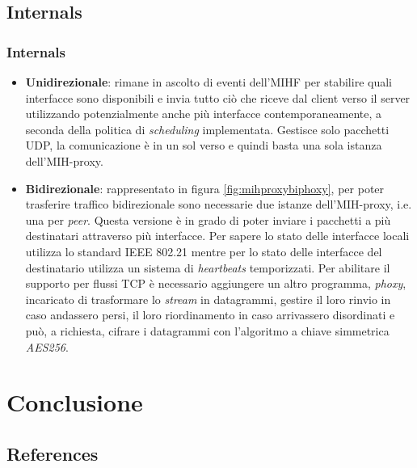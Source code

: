 \documentclass[10pt]{beamer}
\begin{document}
\subsection{Internals}
\begin{frame} %
\frametitle{Internals}
\begin{itemize}
\item \textbf{Unidirezionale}: rimane in ascolto di eventi dell'MIHF per stabilire quali interfacce sono disponibili e invia tutto ciò che riceve dal client verso il server utilizzando potenzialmente anche più interfacce contemporaneamente, a seconda della politica di {\em scheduling} implementata. Gestisce solo pacchetti UDP, la comunicazione è in un sol verso e quindi basta una sola istanza dell'MIH-proxy.
\item \textbf{Bidirezionale}: rappresentato in figura \ref{fig:mihproxybiphoxy}, per poter trasferire traffico bidirezionale sono necessarie due istanze dell'MIH-proxy, i.e. una per {\em peer}. Questa versione è in grado di poter inviare i pacchetti a più destinatari attraverso più interfacce. Per sapere lo stato delle interfacce locali utilizza lo standard IEEE 802.21 mentre per lo stato delle interfacce del destinatario utilizza un sistema di {\em heartbeats} temporizzati. Per abilitare il supporto per flussi TCP è necessario aggiungere un altro programma, {\em phoxy}, incaricato di trasformare lo {\em stream} in datagrammi, gestire il loro rinvio in caso andassero persi, il loro riordinamento in caso arrivassero disordinati e può, a richiesta, cifrare i datagrammi con l'algoritmo a chiave simmetrica {\em AES256}.
\end{itemize}
\end{frame}

\section{Conclusione}
\subsection{References}
\end{document}
